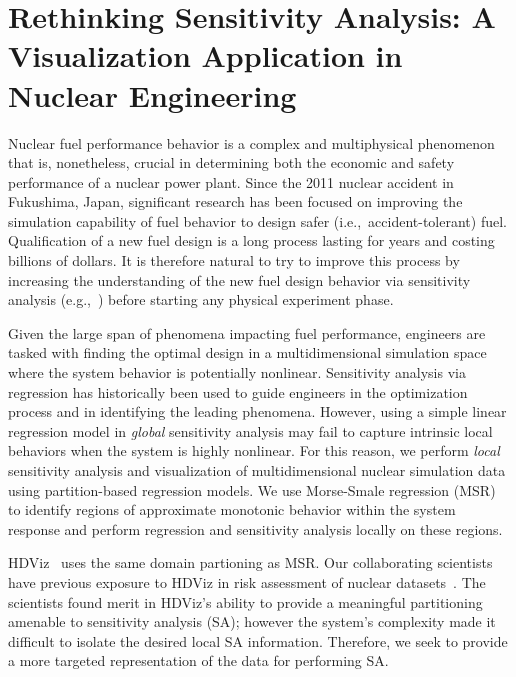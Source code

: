 
\chapter{Rethinking Sensitivity Analysis: A Visualization Application in \protect\\ Nuclear Engineering}
\label{ch:visualization}
Nuclear fuel performance behavior is a complex and multiphysical phenomenon that is, nonetheless, crucial in determining both the economic and safety performance of a nuclear power plant.
%
Since the 2011 nuclear accident in Fukushima, Japan, significant research has been focused on improving the simulation capability of fuel behavior to design safer (i.e.,\ accident-tolerant) fuel.
%
Qualification of a new fuel design is a long process lasting for years and costing billions of dollars.
%
It is therefore natural to try to improve this process by increasing the understanding of the new fuel design behavior via sensitivity analysis (e.g.,~\cite{IkonenTulkki2014,PastoreSwilerHales2015}) before starting any physical experiment phase.

Given the large span of phenomena impacting fuel performance, engineers are tasked with finding the optimal design in a multidimensional simulation space where the system behavior is potentially nonlinear.
%
Sensitivity analysis via regression has historically been used to guide engineers in the optimization process and in identifying the leading phenomena.
%
However, using a simple linear regression model in \emph{global} sensitivity analysis may fail to capture intrinsic local behaviors when the system is highly nonlinear.
%
For this reason, we perform \emph{local} sensitivity analysis and visualization of multidimensional nuclear simulation data using partition-based regression models.
%
We use Morse-Smale regression (MSR)~\cite{GerberRubelBremer2011} to identify regions of approximate monotonic behavior within the system response and perform regression and sensitivity analysis locally on these regions.

HDViz~\cite{GerberBremerPascucci2010} uses the same domain partioning as MSR.
%
Our collaborating scientists have previous exposure to HDViz in risk assessment of nuclear datasets~\cite{MaljovecWangMandelli2013a,MaljovecWangPascucci2013}.
%
The scientists found merit in HDViz's ability to provide a meaningful partitioning amenable to sensitivity analysis (SA); however the system's complexity made it difficult to isolate the desired local SA information.
%
Therefore, we seek to provide a more targeted representation of the data for performing SA.

